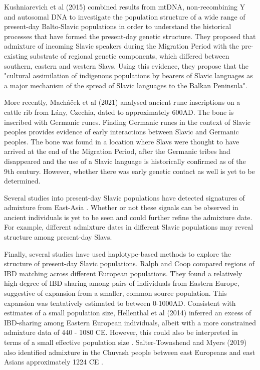 Kushniarevich et al (2015) \cite{Kushniarevich23015} combined results from mtDNA, non-recombining Y and autosomal DNA to investigate the population structure of a wide range of present-day Balto-Slavic populations in order to understand the historical processes that have formed the present-day genetic structure. They proposed that admixture of incoming Slavic speakers during the Migration Period with the pre-existing substrate of regional genetic components, which differed between southern, eastern and western Slavs. Using this evidence, they propose that the "cultural assimilation of indigenous populations by bearers of Slavic languages as a major mechanism of the spread of Slavic languages to the Balkan Peninsula".

More recently, Macháček et al (2021) \cite{MACHACEK2021105333} analysed ancient rune inscriptions on a cattle rib from Lány, Czechia, dated to approximately 600AD. The bone is inscribed with Germanic runes. Finding Germanic runes in the context of Slavic peoples provides evidence of early interactions between Slavic and Germanic peoples. The bone was found in a location where Slavs were thought to have arrived at the end of the Migration Period, after the Germanic tribes had disappeared and the use of a Slavic language is historically confirmed as of the 9th century. However, whether there was early genetic contact as well is yet to be determined. 

Several studies into present-day Slavic populations have detected signatures of admixture from East-Asia \cite{Hellenthal2014, pankratov2016east, MOSAIC_2019, maliarchuk2008origin, qin2015quantitating}. Whether or not these signals can be observed in ancient individuals is yet to be seen and could further refine the admixture date. For example, different admixture dates in different Slavic populations may reveal structure among present-day Slavs. 

Finally, several studies have used haplotype-based methods to explore the structure of present-day Slavic populations. Ralph and Coop \cite{RalphCoop2013} compared regions of IBD matching  across different European populations. They found a relatively high degree of IBD sharing among pairs of individuals from Eastern Europe, suggestive of expansion from a smaller, common source population. This expansion was tentatively estimated to between 0-1000AD. Consistent with estimates of a small population size, Hellenthal et al (2014) \cite{Hellenthal2014} inferred an excess of IBD-sharing among Eastern European individuals, albeit with a more constrained admixture data of 440 - 1080 CE. However, this could also be interpreted in terms of a small effective population size \cite{al2019estimating, ringbauer2017inferring}. Salter-Townshend and Myers (2019) also identified admixture in the Chuvash people between east Europeans and east Asians approximately 1224 CE \cite{MOSAIC_2019}.


